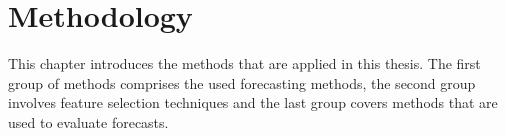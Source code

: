 \chapter{Methodology}
\label{ch:methods}

This chapter introduces the methods that are applied in this thesis. The first group of methods comprises the used forecasting methods, the second group involves feature selection techniques and the last group covers methods that are used to evaluate forecasts.\\


%
%

